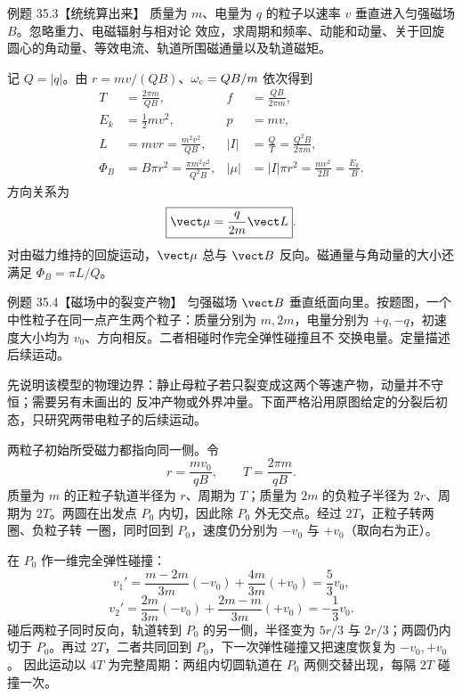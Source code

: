 \Needspace{0.48\textheight}
\begin{origexamplebox}{例题 35.3【统统算出来】}
质量为 $m$、电量为 $q$ 的粒子以速率 $v$ 垂直进入匀强磁场 $B$。忽略重力、电磁辐射与相对论
效应，求周期和频率、动能和动量、关于回旋圆心的角动量、等效电流、轨道所围磁通量以及轨道磁矩。
\end{origexamplebox}

\begin{xesolution}
记 $Q=|q|$。由 $r=mv/(QB)$、$\omega_{\rm c}=QB/m$ 依次得到
\begin{align}
  T&=\frac{2\pi m}{QB},
  & f&=\frac{QB}{2\pi m},\\
  E_k&=\frac12mv^2,
  & p&=mv,\\
  L&=mvr=\frac{m^2v^2}{QB},
  & |I|&=\frac{Q}{T}=\frac{Q^2B}{2\pi m},\\
  \Phi_B&=B\pi r^2=\frac{\pi m^2v^2}{Q^2B},
  & |\mu|&=|I|\pi r^2=\frac{mv^2}{2B}=\frac{E_k}{B}.
\end{align}
方向关系为
\begin{equation}
  \boxed{\vect\mu=\frac{q}{2m}\vect L}.
\end{equation}
对由磁力维持的回旋运动，$\vect\mu$ 总与 $\vect B$ 反向。磁通量与角动量的大小还满足
$\Phi_B=\pi L/Q$。
\end{xesolution}

\Needspace{0.47\textheight}
\begin{origexamplebox}{例题 35.4【磁场中的裂变产物】}
匀强磁场 $\vect B$ 垂直纸面向里。按题图，一个中性粒子在同一点产生两个粒子：质量分别为
$m,2m$，电量分别为 $+q,-q$，初速度大小均为 $v_0$、方向相反。二者相碰时作完全弹性碰撞且不
交换电量。定量描述后续运动。
\end{origexamplebox}

\begin{xesolution}
先说明该模型的物理边界：静止母粒子若只裂变成这两个等速产物，动量并不守恒；需要另有未画出的
反冲产物或外界冲量。下面严格沿用原图给定的分裂后初态，只研究两带电粒子的后续运动。

两粒子初始所受磁力都指向同一侧。令
\[
  r=\frac{mv_0}{qB},
  \qquad T=\frac{2\pi m}{qB}.
\]
质量为 $m$ 的正粒子轨道半径为 $r$、周期为 $T$；质量为 $2m$ 的负粒子半径为 $2r$、周期为
$2T$。两圆在出发点 $P_0$ 内切，因此除 $P_0$ 外无交点。经过 $2T$，正粒子转两圈、负粒子转
一圈，同时回到 $P_0$，速度仍分别为 $-v_0$ 与 $+v_0$（取向右为正）。

在 $P_0$ 作一维完全弹性碰撞：
\[
  v_1'=\frac{m-2m}{3m}(-v_0)+\frac{4m}{3m}(+v_0)=\frac53v_0,
\]
\[
  v_2'=\frac{2m}{3m}(-v_0)+\frac{2m-m}{3m}(+v_0)=-\frac13v_0.
\]
碰后两粒子同时反向，轨道转到 $P_0$ 的另一侧，半径变为 $5r/3$ 与 $2r/3$；两圆仍内切于
$P_0$。再过 $2T$，二者共同回到 $P_0$，下一次弹性碰撞又把速度恢复为 $-v_0,+v_0$。
因此运动以 $4T$ 为完整周期：两组内切圆轨道在 $P_0$ 两侧交替出现，每隔 $2T$ 碰撞一次。

\splitProductsDiagram
\end{xesolution}

